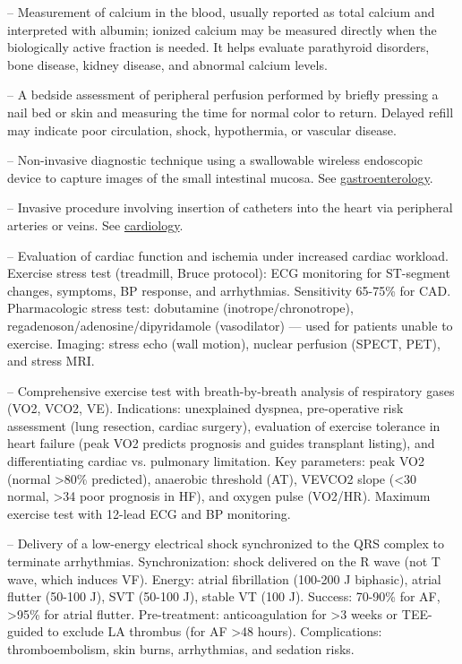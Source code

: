-- Measurement of calcium in the blood, usually reported as total calcium and interpreted with albumin; ionized calcium may be measured directly when the biologically active fraction is needed. It helps evaluate parathyroid disorders, bone disease, kidney disease, and abnormal calcium levels.

-- A bedside assessment of peripheral perfusion performed by briefly pressing a nail bed or skin and measuring the time for normal color to return. Delayed refill may indicate poor circulation, shock, hypothermia, or vascular disease.

-- Non-invasive diagnostic technique using a swallowable wireless endoscopic device to capture images of the small intestinal mucosa. See \hyperlink{Gastroenterology}{gastroenterology}.

-- Invasive procedure involving insertion of catheters into the heart via peripheral arteries or veins. See \hyperlink{Cardiology}{cardiology}.

-- Evaluation of cardiac function and ischemia under increased cardiac workload. Exercise stress test (treadmill, Bruce protocol): ECG monitoring for ST-segment changes, symptoms, BP response, and arrhythmias. Sensitivity 65-75\% for CAD. Pharmacologic stress test: dobutamine (inotrope/chronotrope), regadenoson/adenosine/dipyridamole (vasodilator) — used for patients unable to exercise. Imaging: stress echo (wall motion), nuclear perfusion (SPECT, PET), and stress MRI.

-- Comprehensive exercise test with breath-by-breath analysis of respiratory gases (VO2, VCO2, VE). Indications: unexplained dyspnea, pre-operative risk assessment (lung resection, cardiac surgery), evaluation of exercise tolerance in heart failure (peak VO2 predicts prognosis and guides transplant listing), and differentiating cardiac vs. pulmonary limitation. Key parameters: peak VO2 (normal >80\% predicted), anaerobic threshold (AT), VEVCO2 slope (<30 normal, >34 poor prognosis in HF), and oxygen pulse (VO2/HR). Maximum exercise test with 12-lead ECG and BP monitoring.

-- Delivery of a low-energy electrical shock synchronized to the QRS complex to terminate arrhythmias. Synchronization: shock delivered on the R wave (not T wave, which induces VF). Energy: atrial fibrillation (100-200 J biphasic), atrial flutter (50-100 J), SVT (50-100 J), stable VT (100 J). Success: 70-90\% for AF, >95\% for atrial flutter. Pre-treatment: anticoagulation for >3 weeks or TEE-guided to exclude LA thrombus (for AF >48 hours). Complications: thromboembolism, skin burns, arrhythmias, and sedation risks.


